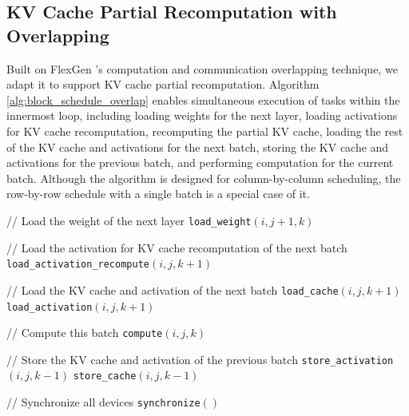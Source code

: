\documentclass[11pt]{article}
\begin{document}
\subsection{KV Cache Partial Recomputation with Overlapping}
\label{app:overlapping}

Built on FlexGen \cite{sheng2023flexgen}'s computation and communication overlapping technique, we adapt it to support KV cache partial recomputation. Algorithm \ref{alg:block_schedule_overlap} enables simultaneous execution of tasks within the innermost loop, including loading weights for the next layer, loading activations for KV cache recomputation, recomputing the partial KV cache, loading the rest of the KV cache and activations for the next batch, storing the KV cache and activations for the previous batch, and performing computation for the current batch. Although the algorithm is designed for column-by-column scheduling, the row-by-row schedule with a single batch is a special case of it.


\begin{algorithm}[t!]
\caption{KV Cache Partial Recomputation with Overlapping}
\label{alg:block_schedule_overlap}
\begin{algorithmic} %
            \STATE // Load the weight of the next layer
            \STATE \texttt{load\_weight}$(i, j+1, k)$
            
            \STATE // Load the activation for KV cache recomputation of the next batch
            \STATE \texttt{load\_activation\_recompute}$(i, j, k+1)$
            
            \STATE // Load the KV cache and activation of the next batch
            \STATE \texttt{load\_cache}$(i, j, k+1)$
            \STATE \texttt{load\_activation}$(i, j, k+1)$
            
            \STATE // Compute this batch
            \STATE \texttt{compute}$(i, j, k)$
            
            \STATE // Store the KV cache and activation of the previous batch
            \STATE \texttt{store\_activation}$(i, j, k-1)$
            \STATE \texttt{store\_cache}$(i, j, k-1)$
            
            \STATE // Synchronize all devices
            \STATE \texttt{synchronize}$()$
        \ENDFOR
    \ENDFOR
\ENDFOR
\end{algorithmic}
\end{algorithm}
\end{document}
